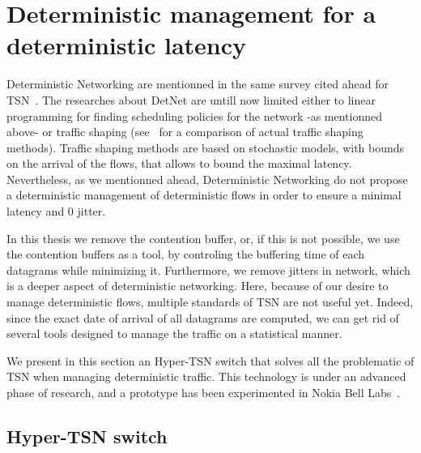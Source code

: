 \section{Deterministic management for a deterministic latency}
\label{sec:platform}


Deterministic Networking are mentionned in the same survey cited ahead for TSN~\cite{8458130}. The researches about DetNet are untill now limited either to linear programming for finding scheduling policies for the network -as mentionned above- or traffic shaping (see~\cite{7092358} for a comparison of actual traffic shaping methods). Traffic shaping methods are based on stochastic models, with bounds on the arrival of the flows, that allows to bound the maximal latency. Nevertheless, as we mentionned ahead, Deterministic Networking do not propose a deterministic management of deterministic flows in order to ensure a minimal latency and $0$ jitter.

In this thesis we remove the contention buffer, or, if this is not possible, we use the contention buffers as a tool, by controling the buffering time of each datagrams while minimizing it. Furthermore, we remove jitters in network, which is a deeper aspect of deterministic networking.
Here, because of our desire to manage deterministic flows, multiple standards of TSN are not useful yet. Indeed, since the exact date of arrival of all datagrams are computed, we can get rid of several tools designed to manage the traffic on a statistical manner. 

We present in this section an Hyper-TSN switch that solves all the problematic of TSN when managing deterministic traffic.
This technology is under an advanced phase of research, and a prototype has been experimented in Nokia Bell Labs~\cite{guiraudleclercmarce2021}.

\subsection{Hyper-TSN switch}


